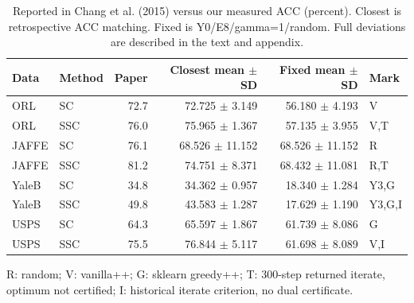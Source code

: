 \begin{table}[t]
\centering\small
\caption{Reported in Chang et al. (2015) versus our measured ACC (percent). Closest is retrospective ACC matching. Fixed is Y0/E8/gamma=1/random. Full deviations are described in the text and appendix.}
\label{tab:main}
\begin{tabular}{llrrrl}
\toprule Data & Method & Paper & Closest mean $\pm$ SD & Fixed mean $\pm$ SD & Mark \\
\midrule
ORL & SC & 72.7 & 72.725 $\pm$ 3.149 & 56.180 $\pm$ 4.193 & V \\
ORL & SSC & 76.0 & 75.965 $\pm$ 1.367 & 57.135 $\pm$ 3.955 & V,T \\
JAFFE & SC & 76.1 & 68.526 $\pm$ 11.152 & 68.526 $\pm$ 11.152 & R \\
JAFFE & SSC & 81.2 & 74.751 $\pm$ 8.371 & 68.432 $\pm$ 11.081 & R,T \\
YaleB & SC & 34.8 & 34.362 $\pm$ 0.957 & 18.340 $\pm$ 1.284 & Y3,G \\
YaleB & SSC & 49.8 & 43.583 $\pm$ 1.287 & 17.629 $\pm$ 1.190 & Y3,G,I \\
USPS & SC & 64.3 & 65.597 $\pm$ 1.867 & 61.739 $\pm$ 8.086 & G \\
USPS & SSC & 75.5 & 76.844 $\pm$ 5.117 & 61.698 $\pm$ 8.089 & V,I \\
\bottomrule\end{tabular}
\par\footnotesize R: random; V: vanilla++; G: sklearn greedy++; T: 300-step returned iterate, optimum not certified; I: historical iterate criterion, no dual certificate.
\end{table}
